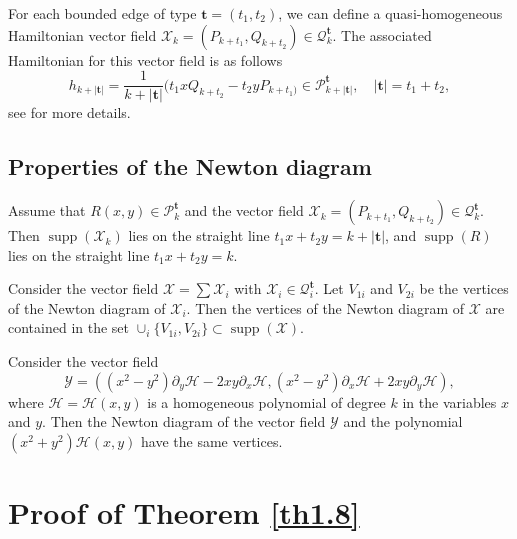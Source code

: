 \documentclass[reqno]{amsart}
\begin{document}
For each bounded edge of type $\mathbf{t}=(t_1,t_2)$, we can define a quasi-homogeneous 
Hamiltonian vector field 
$\mathscr{X}_{k}=(P_{k+t_{1}},Q_{k+t_{2}})\in \mathcal{Q}_{k}^{\mathbf{t}}$. 
The associated Hamiltonian for this vector field is as follows
\begin{equation}\label{eq2-6}
h_{k+|\mathbf{t}|}=\frac{1}{k+|\mathbf{t}|}(t_{1}xQ_{k+t_2}-t_{2}yP_{k+t_1)}
\in \mathcal{P}_{k+|\mathbf{t}|}^{\mathbf{t}}, \quad |\mathbf{t}|=t_1+t_2,
\end{equation}
see \cite{bib 1} for more details.

\subsection{Properties of the Newton diagram}

\begin{lemma} \label{lem2.1}
Assume that $R(x,y)\in \mathcal{P}_{k}^{\textbf{t}}$ and the vector 
field  $\mathscr{X}_{k}=(P_{k+t_{1}},Q_{k+t_{2}})\in \mathcal{Q}_{k}^{\textbf{t}}$. 
Then $\operatorname{supp}(\mathscr{X}_{k})$ lies on the straight line 
$t_1x+t_2y=k+|\textbf{t}|$, and $\operatorname{supp}(R)$ lies on the straight line
$t_1x+t_2y=k$.
\end{lemma}

\begin{lemma} \label{lem2.2}
Consider the vector field $\mathscr{X}=\sum \mathscr{X}_{i}$ with 
$\mathscr{X}_{i}\in \mathcal{Q}_{i}^{\textbf{t}}$. Let $V_{1i}$ and $V_{2i}$ be the 
vertices of the Newton diagram of $\mathscr{X}_{i}$. Then the vertices of the Newton 
diagram of $\mathscr{X}$ are contained in
the set $\cup_{i}\{V_{1i},V_{2i}\}\subset \operatorname{supp}(\mathscr{X})$.
\end{lemma}

\begin{lemma} \label{lem2.3}
 Consider the vector field
\[
\mathcal{Y}=((x^2-y^2)\partial_{y}\mathcal{H}-2xy\partial_{x}\mathcal{H}, 
(x^2-y^2)\partial_{x}\mathcal{H}+2xy\partial_{y}\mathcal{H}),
\]
where $\mathcal{H}=\mathcal{H}(x,y)$ is a homogeneous polynomial of degree $k$ in 
the variables $x$ and $y$. Then the Newton diagram of the vector field $\mathcal{Y}$ 
and the polynomial $(x^2+y^2)\mathcal{H}(x,y)$ have the same vertices.
\end{lemma}

\section{Proof of Theorem \ref{th1.8}}\label{sec3}
\end{document}
